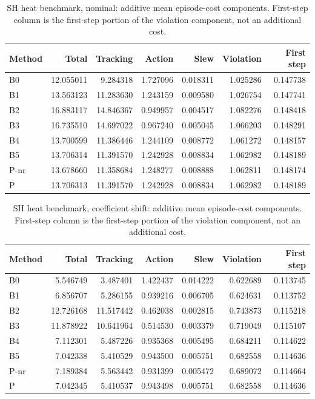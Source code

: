\begin{table}[ht]
\caption{SH heat benchmark, nominal: additive mean episode-cost components. First-step column is the first-step portion of the violation component, not an additional cost.}\label{tab:costparts_locked_nominal}
\centering\small
\begin{tabular}{@{}lrrrrrr@{}}\toprule
Method & Total & Tracking & Action & Slew & Violation & First step\\\midrule
B0 & 12.055011 & 9.284318 & 1.727096 & 0.018311 & 1.025286 & 0.147738 \\
B1 & 13.563123 & 11.283630 & 1.243159 & 0.009580 & 1.026754 & 0.147741 \\
B2 & 16.883117 & 14.846367 & 0.949957 & 0.004517 & 1.082276 & 0.148418 \\
B3 & 16.735510 & 14.697022 & 0.967240 & 0.005045 & 1.066203 & 0.148291 \\
B4 & 13.700599 & 11.386446 & 1.244109 & 0.008772 & 1.061272 & 0.148157 \\
B5 & 13.706314 & 11.391570 & 1.242928 & 0.008834 & 1.062982 & 0.148189 \\
P-nr & 13.678660 & 11.358684 & 1.248277 & 0.008888 & 1.062811 & 0.148174 \\
P & 13.706313 & 11.391570 & 1.242928 & 0.008834 & 1.062982 & 0.148189 \\
\bottomrule\end{tabular}
\end{table}
\begin{table}[ht]
\caption{SH heat benchmark, coefficient shift: additive mean episode-cost components. First-step column is the first-step portion of the violation component, not an additional cost.}\label{tab:costparts_locked_coefficient_ood}
\centering\small
\begin{tabular}{@{}lrrrrrr@{}}\toprule
Method & Total & Tracking & Action & Slew & Violation & First step\\\midrule
B0 & 5.546749 & 3.487401 & 1.422437 & 0.014222 & 0.622689 & 0.113745 \\
B1 & 6.856707 & 5.286155 & 0.939216 & 0.006705 & 0.624631 & 0.113752 \\
B2 & 12.726168 & 11.517442 & 0.462038 & 0.002815 & 0.743873 & 0.115218 \\
B3 & 11.878922 & 10.641964 & 0.514530 & 0.003379 & 0.719049 & 0.115107 \\
B4 & 7.112301 & 5.487226 & 0.935368 & 0.005495 & 0.684211 & 0.114622 \\
B5 & 7.042338 & 5.410529 & 0.943500 & 0.005751 & 0.682558 & 0.114636 \\
P-nr & 7.189384 & 5.563442 & 0.931399 & 0.005472 & 0.689072 & 0.114664 \\
P & 7.042345 & 5.410537 & 0.943498 & 0.005751 & 0.682558 & 0.114636 \\
\bottomrule\end{tabular}
\end{table}
